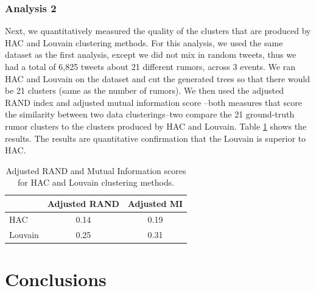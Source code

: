 \documentclass[letterpaper]{article}
\begin{document}
\subsubsection{Analysis 2}
Next, we quantitatively measured the quality of the clusters that are produced by HAC and Louvain clustering methods. For this analysis, we used the same dataset as the first analysis, except we did not mix in random tweets, thus we had a total of 6,825 tweets about 21 different rumors, across 3 events. We ran HAC and Louvain on the dataset and cut the generated trees so that there would be 21 clusters (same as the number of rumors). We then used the adjusted RAND index \cite{rand1971objective} and adjusted mutual information score \cite{vinh2010information}--both measures that score the similarity between two data clusterings--two compare the 21 ground-truth rumor clusters to the clusters produced by HAC and Louvain. Table \ref{tab:rand} shows the results. The results are quantitative confirmation that the Louvain is superior to HAC.

\begin{table}[!htbp]
\centering
\small
\begin{tabular}{@{}l|c|c@{}}
& Adjusted RAND & Adjusted MI \\
\hline
HAC & 0.14 & 0.19  \\
\hline
Louvain & 0.25 & 0.31    \\
\end{tabular}
\caption{Adjusted RAND and Mutual Information scores for HAC and Louvain clustering methods.}

\label{tab:rand}
\end{table}


\section{Conclusions}
\end{document}
